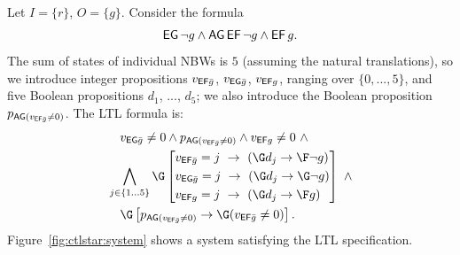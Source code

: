 \begin{example}\label{ex:ctlstar}
Let $I = \{r\}$, $O=\{g\}$.
Consider the \CTL formula
$$
\operatorname{\mathsf{EG}} \neg g \land \operatorname{\mathsf{AG}}\operatorname{\mathsf{EF}} \neg g \land \operatorname{\mathsf{EF}} g.
$$
The sum of states of individual NBWs is $5$
(assuming the natural translations),
so we introduce integer propositions $v_{\operatorname{\mathsf{EF}}\!\bar{g}}$, $v_{\operatorname{\mathsf{EG}}\!\bar{g}}$, $v_{\operatorname{\mathsf{EF}}\!g}$, ranging over $\{0,...,5\}$,
and five Boolean propositions $d_1$, ..., $d_5$;
we also introduce the Boolean proposition $p_{\operatorname{\mathsf{AG}}(v_{\operatorname{\mathsf{EF}}\!\bar{g}}\neq 0)}$.
The LTL formula is:
\begin{align*}
&~~~v_{\EG\!\bar{g}} \neq 0 \land p_{\AG(v_{\EF\!\bar{g}}\neq 0)} \land v_{\EF\!g} \neq 0 ~\land \\
&\bigwedge_{j \in \{1...5\}}\G \left[
\begin{aligned}
& v_{\EF\!\bar{g}}=j ~\impl~ (\G d_j \impl \F \neg g) \\
& v_{\EG\!\bar{g}}=j ~\impl~ (\G d_j \impl \G \neg g) \\
& v_{\EF\!g}=j ~\impl~ (\G d_j \impl \F g)
\end{aligned}
\right] ~\land\\
&~~~\G\left[p_{\AG(v_{\EF\!\bar{g}}\neq 0)} \impl \G(v_{\EF\!\bar{g}}\neq 0)\right].
\end{align*}
Figure~\ref{fig:ctlstar:system} shows a system satisfying the LTL specification.

\begin{figure}[bt]
\center
{}
\end{figure}
\end{example}
